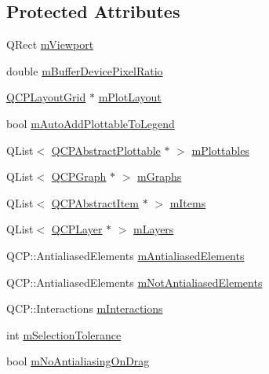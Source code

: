 \subsection*{Protected Attributes}
\begin{DoxyCompactItemize}
\item 
Q\+Rect \mbox{\hyperlink{class_q_custom_plot_ac0a7c38a715526c257cff95774f83ab6}{m\+Viewport}}
\item 
double \mbox{\hyperlink{class_q_custom_plot_a63a40c57a2d89eea27b90b62cc4eee1f}{m\+Buffer\+Device\+Pixel\+Ratio}}
\item 
\mbox{\hyperlink{class_q_c_p_layout_grid}{Q\+C\+P\+Layout\+Grid}} $\ast$ \mbox{\hyperlink{class_q_custom_plot_ac97298756882a0eecd98151679850ac1}{m\+Plot\+Layout}}
\item 
bool \mbox{\hyperlink{class_q_custom_plot_aaf3ea6a4cb04d35a149cc9a0cdac3394}{m\+Auto\+Add\+Plottable\+To\+Legend}}
\item 
Q\+List$<$ \mbox{\hyperlink{class_q_c_p_abstract_plottable}{Q\+C\+P\+Abstract\+Plottable}} $\ast$ $>$ \mbox{\hyperlink{class_q_custom_plot_a62bf8e4e7f8d23fc1e9301ba0148269f}{m\+Plottables}}
\item 
Q\+List$<$ \mbox{\hyperlink{class_q_c_p_graph}{Q\+C\+P\+Graph}} $\ast$ $>$ \mbox{\hyperlink{class_q_custom_plot_adaf8d407d72a725169d7dbed2ee386bb}{m\+Graphs}}
\item 
Q\+List$<$ \mbox{\hyperlink{class_q_c_p_abstract_item}{Q\+C\+P\+Abstract\+Item}} $\ast$ $>$ \mbox{\hyperlink{class_q_custom_plot_a6a93905372326e31e98d6c3bc8953ec8}{m\+Items}}
\item 
Q\+List$<$ \mbox{\hyperlink{class_q_c_p_layer}{Q\+C\+P\+Layer}} $\ast$ $>$ \mbox{\hyperlink{class_q_custom_plot_a72ee313041b873d76c198793ce7e6c37}{m\+Layers}}
\item 
Q\+C\+P\+::\+Antialiased\+Elements \mbox{\hyperlink{class_q_custom_plot_aa333200629256830e273873b582a5524}{m\+Antialiased\+Elements}}
\item 
Q\+C\+P\+::\+Antialiased\+Elements \mbox{\hyperlink{class_q_custom_plot_a2b6ebcad00a90ba07f146cefcd4293da}{m\+Not\+Antialiased\+Elements}}
\item 
Q\+C\+P\+::\+Interactions \mbox{\hyperlink{class_q_custom_plot_ad717377ceba7493b4b32f0bcbbdf1895}{m\+Interactions}}
\item 
int \mbox{\hyperlink{class_q_custom_plot_abc36e12dd0482117ad810a800c847722}{m\+Selection\+Tolerance}}
\item 
bool \mbox{\hyperlink{class_q_custom_plot_ac83df968435f6b8ec79f2993ab9124e8}{m\+No\+Antialiasing\+On\+Drag}}

\end{DoxyCompactItemize}
